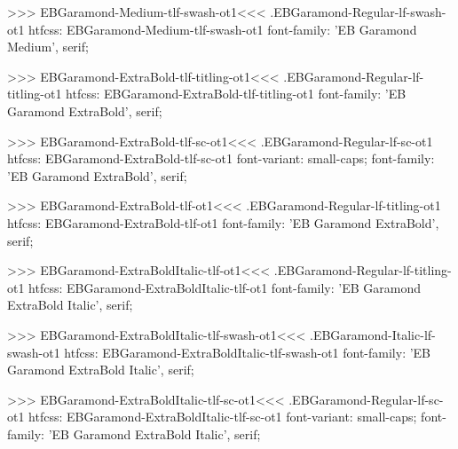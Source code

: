 {{{{{{{>>>
\<EBGaramond-Medium-tlf-swash-ot1\><<<
.EBGaramond-Regular-lf-swash-ot1
htfcss:  EBGaramond-Medium-tlf-swash-ot1  font-family: 'EB Garamond Medium', serif;

>>>
\<EBGaramond-ExtraBold-tlf-titling-ot1\><<<
.EBGaramond-Regular-lf-titling-ot1
htfcss:  EBGaramond-ExtraBold-tlf-titling-ot1  font-family: 'EB Garamond ExtraBold', serif;

>>>
\<EBGaramond-ExtraBold-tlf-sc-ot1\><<<
.EBGaramond-Regular-lf-sc-ot1
htfcss:  EBGaramond-ExtraBold-tlf-sc-ot1  font-variant: small-caps; font-family: 'EB Garamond ExtraBold', serif;

>>>
\<EBGaramond-ExtraBold-tlf-ot1\><<<
.EBGaramond-Regular-lf-titling-ot1
htfcss:  EBGaramond-ExtraBold-tlf-ot1  font-family: 'EB Garamond ExtraBold', serif;

>>>
\<EBGaramond-ExtraBoldItalic-tlf-ot1\><<<
.EBGaramond-Regular-lf-titling-ot1
htfcss:  EBGaramond-ExtraBoldItalic-tlf-ot1  font-family: 'EB Garamond ExtraBold Italic', serif;

>>>
\<EBGaramond-ExtraBoldItalic-tlf-swash-ot1\><<<
.EBGaramond-Italic-lf-swash-ot1
htfcss:  EBGaramond-ExtraBoldItalic-tlf-swash-ot1  font-family: 'EB Garamond ExtraBold Italic', serif;

>>>
\<EBGaramond-ExtraBoldItalic-tlf-sc-ot1\><<<
.EBGaramond-Regular-lf-sc-ot1
htfcss:  EBGaramond-ExtraBoldItalic-tlf-sc-ot1  font-variant: small-caps; font-family: 'EB Garamond ExtraBold Italic', serif;

}}}}}}}
